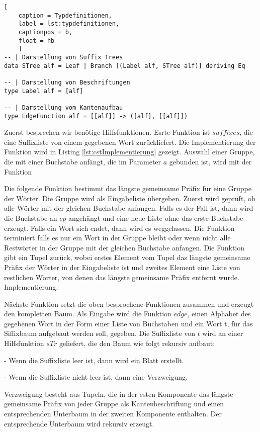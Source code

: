 \documentclass[12pt]{report}
\begin{document}
\begin{lstlisting}[
    caption = Typdefinitionen,
    label = lst:typdefinitionen,
    captionpos = b,
    float = hb
    ]
-- | Darstellung von Suffix Trees
data STree alf = Leaf | Branch [(Label alf, STree alf)] deriving Eq

-- | Darstellung von Beschriftungen
type Label alf = [alf]

-- | Darstellung vom Kantenaufbau
type EdgeFunction alf = [[alf]] -> ([alf], [[alf]])
\end{lstlisting}

Zuerst besprechen wir benötige Hilfsfunktionen. Esrte Funktion ist $suffixes$, die eine Suffixliste von einem gegebenen Wort zurückliefert. Die Implementierung der Funktion wird in Listing \ref{lst:cstImplementierung} gezeigt.
Auswahl einer Gruppe, die mit einer Buchstabe anfängt, die im Parameter $a$ gebunden ist, wird mit der Funktion 

Die folgende Funktion bestimmt das längste gemeinsame Präfix für eine Gruppe der Wörter. Die Gruppe wird als Eingabeliste übergeben. Zuerst wird geprüft, ob alle Wörter mit der gleichen Buchstabe anfangen. Falls es der Fall ist, dann wird die Buchstabe an $cp$ angehängt und eine neue Liste ohne das erste Buchstabe erzeugt. Falls ein Wort sich endet, dann wird es weggelassen. Die Funktion terminiert falls es nur ein Wort in der Gruppe bleibt oder wenn nicht alle Restwörter in der Gruppe mit der gleichen Buchstabe anfangen. Die Funktion gibt ein Tupel zurück, wobei erstes Element vom Tupel das längste gemeinsame Präfix der Wörter in der Eingabeliste ist und zweites Element eine Liste von restlichen Wörter, von denen das längste gemeinsame Präfix entfernt wurde. Implementierung:

Nächste Funktion setzt die oben besprochene Funktionen zusammen und erzeugt den kompletten Baum. Als Eingabe wird die Funktion $edge$, einen Alphabet des gegebenen Wort in der Form einer Liste von Buchstaben und ein Wort t, für das Siffixbaum aufgebaut werden soll, gegeben. Die Suffixliste von $t$ wird an einer Hilfsfunktion $sTr$ geliefert, die den Baum wie folgt rekursiv aufbaut:

    - Wenn die Suffixliste leer ist, dann wird ein Blatt erstellt.

    - Wenn die Suffixliste nicht leer ist, dann eine Verzweigung.

Verzweigung besteht aus Tupeln, die in der esten Komponente das längste gemeinsame Präfix von jeder Gruppe als Kantenbeschriftung und einen entsprechenden Unterbaum in der zweiten Komponente enthalten. Der entsprechende Unterbaum wird rekursiv erzeugt.
\end{document}

